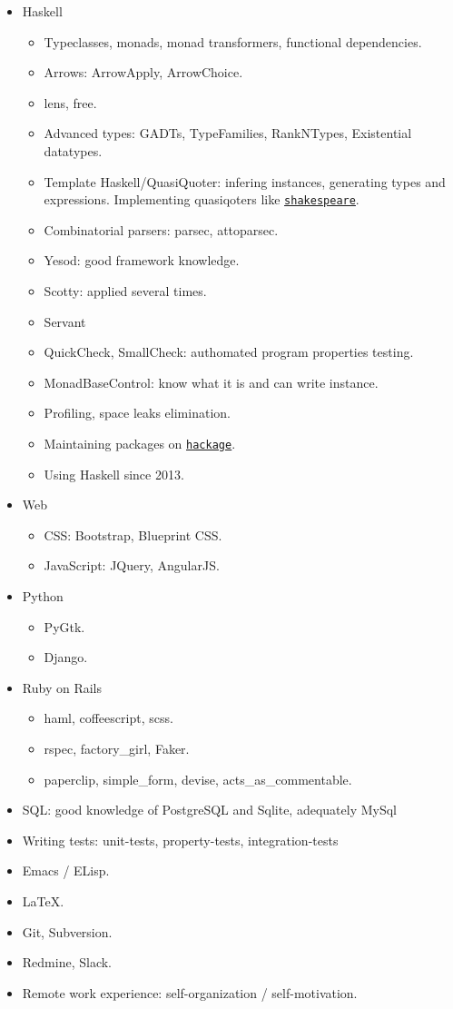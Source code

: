 \documentclass[11pt,a4paper,sans]{moderncv}
\newcommand*{\nlink}[2]{\textcolor{blue}{\texttt{\underline{\href{#1}{#2}}}}}
\begin{document}
\begin{itemize}
\item Haskell
  \begin{itemize}
  \item Typeclasses, monads, monad transformers, functional dependencies.
  \item Arrows: ArrowApply, ArrowChoice.
  \item lens, free.
  \item Advanced types: GADTs, TypeFamilies, RankNTypes, Existential datatypes.
  \item Template Haskell/QuasiQuoter: infering instances, generating
    types and expressions. Implementing quasiqoters like
    \nlink{http://hackage.haskell.org/package/shakespeare}{shakespeare}.
  \item Combinatorial parsers: parsec, attoparsec.
  \item Yesod: good framework knowledge.
  \item Scotty: applied several times.
  \item Servant
  \item QuickCheck, SmallCheck: authomated program properties testing.
  \item MonadBaseControl: know what it is and can write instance.
  \item Profiling, space leaks elimination.
  \item Maintaining packages on
    \nlink{http://hackage.haskell.org/user/AlekseyUymanov}{hackage}.
  \item Using Haskell since 2013.
  \end{itemize}
\item Web
  \begin{itemize}
  \item CSS: Bootstrap, Blueprint CSS.
  \item JavaScript: JQuery, AngularJS.
  \end{itemize}
\item Python
  \begin{itemize}
  \item PyGtk.
  \item Django.
  \end{itemize}
\item Ruby on Rails
  \begin{itemize}
  \item haml, coffeescript, scss.
  \item rspec, factory\_girl, Faker.
  \item paperclip, simple\_form, devise, acts\_as\_commentable.
  \end{itemize}
\item SQL: good knowledge of PostgreSQL and Sqlite, adequately MySql
\item Writing tests: unit-tests, property-tests, integration-tests
\item Emacs / ELisp.
\item \LaTeX.
\item Git, Subversion.
\item Redmine, Slack.
\item Remote work experience: self-organization / self-motivation.
\end{itemize}
\end{document}
